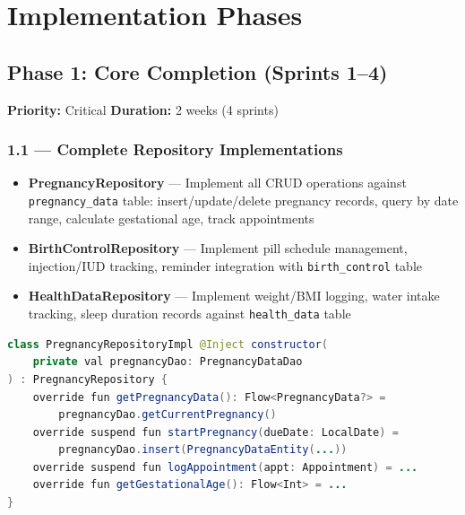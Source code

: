 \documentclass[12pt,a4paper]{article}
\begin{document}
\section{Implementation Phases}

\subsection{\textcolor{phase1}{Phase 1: Core Completion (Sprints 1--4)}}

\begin{tcolorbox}[colback=phase1!5, colframe=phase1, title=\textbf{Goal: Complete all existing stubs and fix critical gaps}]
\textbf{Priority:} Critical \hfill \textbf{Duration:} 2 weeks (4 sprints)
\end{tcolorbox}

\subsubsection{1.1 — Complete Repository Implementations}
\begin{itemize}[leftmargin=1.5em]
  \item \textbf{PregnancyRepository} — Implement all CRUD operations against \texttt{pregnancy\_data} table: insert/update/delete pregnancy records, query by date range, calculate gestational age, track appointments
  \item \textbf{BirthControlRepository} — Implement pill schedule management, injection/IUD tracking, reminder integration with \texttt{birth\_control} table
  \item \textbf{HealthDataRepository} — Implement weight/BMI logging, water intake tracking, sleep duration records against \texttt{health\_data} table
\end{itemize}

\begin{lstlisting}[language=Java, caption=PregnancyRepository pattern]
class PregnancyRepositoryImpl @Inject constructor(
    private val pregnancyDao: PregnancyDataDao
) : PregnancyRepository {
    override fun getPregnancyData(): Flow<PregnancyData?> =
        pregnancyDao.getCurrentPregnancy()
    override suspend fun startPregnancy(dueDate: LocalDate) =
        pregnancyDao.insert(PregnancyDataEntity(...))
    override suspend fun logAppointment(appt: Appointment) = ...
    override fun getGestationalAge(): Flow<Int> = ...
}
\end{lstlisting}
\end{document}
